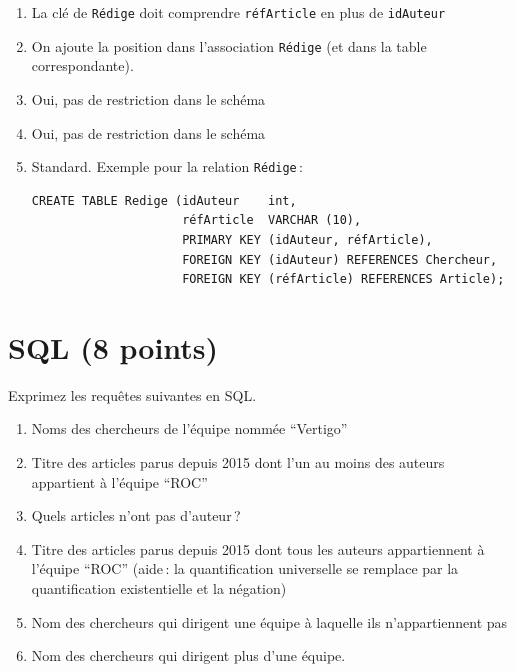 \begin{solution}


\begin{enumerate}
  \item La clé de {\tt Rédige} doit comprendre {\tt réfArticle}
     en plus de {\tt idAuteur}
   \item On ajoute la position dans l'association \texttt{Rédige} (et dans la table correspondante).
   \item Oui, pas de restriction dans le schéma
   \item Oui, pas de restriction dans le schéma
 \item 
Standard. Exemple pour la relation {\tt Rédige}\,:
\begin{verbatim}
CREATE TABLE Redige (idAuteur    int,
                     réfArticle  VARCHAR (10),
                     PRIMARY KEY (idAuteur, réfArticle),
                     FOREIGN KEY (idAuteur) REFERENCES Chercheur,
                     FOREIGN KEY (réfArticle) REFERENCES Article);
\end{verbatim}


\end{enumerate}

\end{solution}

\section{SQL (8 points)}

Exprimez les requêtes suivantes en SQL.

\begin{enumerate}

\item Noms des chercheurs de l'équipe nommée ``Vertigo''
 \item Titre des articles parus depuis 2015 dont l'un au moins des auteurs appartient à l'équipe ``ROC''
\item Quels articles n'ont pas d'auteur\,?
 \item  Titre des articles parus depuis 2015 dont tous les auteurs appartiennent à l'équipe ``ROC'' (aide\,: 
     la quantification universelle se remplace par la quantification existentielle et la négation)
 \item Nom des chercheurs qui dirigent une équipe à laquelle ils n'appartiennent pas
 \item Nom des chercheurs qui dirigent plus d'une équipe.

\end{enumerate}

